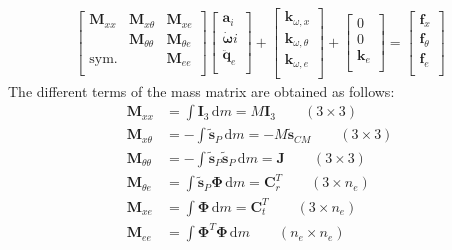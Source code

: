 \documentclass[wes, manuscript]{copernicus}
\renewcommand{\d}{\mathrm{d}}
\renewcommand{\v}[1]{\boldsymbol{#1}}
\newcommand{\m}[1]{\boldsymbol{#1}}
\newcommand{\M} {{\m{M}}}
\newcommand{\stil}  {\m{\tilde{s}}}
\renewcommand{\d}{\mathrm{d}}
\newcommand{\dm}{\d{m}}
\begin{document}
\begin{align}
    \begin{bmatrix}
       \M_{xx}    & \M_{x \theta} & \M_{ x e } \\
                   & \M_{\theta \theta}   & \M_{\theta e}   \\
       \text{sym.} &            & \M_{e e}  \\
    \end{bmatrix}
    \begin{bmatrix}
      \v{a}_i \\
      \v{\dot{\omega}}i \\
      \v{\ddot{q}}_{e} \\
    \end{bmatrix}
      +
    \begin{bmatrix}
      \v{k}_{\omega, x} \\
      \v{k}_{\omega, \theta} \\
      \v{k}_{\omega, e} \\
    \end{bmatrix}
      +
    \begin{bmatrix}
      0 \\
      0 \\
      \v{k}_{e}\\
    \end{bmatrix}
      =
    \begin{bmatrix}
      \v{f}_{x} \\
      \v{f}_{\theta} \\
      \v{f}_{e}\\
    \end{bmatrix}
    \label{eq:EOMFlexibleBodyRepeated}
\end{align}
The different terms of the mass matrix are obtained as follows:
\begin{align}
   \M_{xx}           & =  \int \m{I}_3 \,\dm = M \m{I}_3  \qquad (3\times3)
       \\
   \M_{x\theta}      & = -\int \stil_P \,\dm          = -M \m{\tilde{s}}_{CM}    \qquad (3\times3)
       \\
   \M_{\theta\theta} & = -\int \stil_P \stil_P \,\dm = \v{J}   \qquad (3\times 3) 
   \\
   \M_{\theta e}     & =  \int \stil_P \m{\Phi} \,\dm=\m{C}_r^T  \qquad (3\times n_e)
   \\
   \M_{x e}          & =  \int \m{\Phi} \,\dm =\m{C}_t^T  \qquad (3 \times n_e)
   \\
   \M_{e e}          & =  \int {\m{\Phi}}^T \m{\Phi} \,\dm  \qquad (n_e \times n_e)
    \label{eq:MMFlexible}
\end{align}
\end{document}
